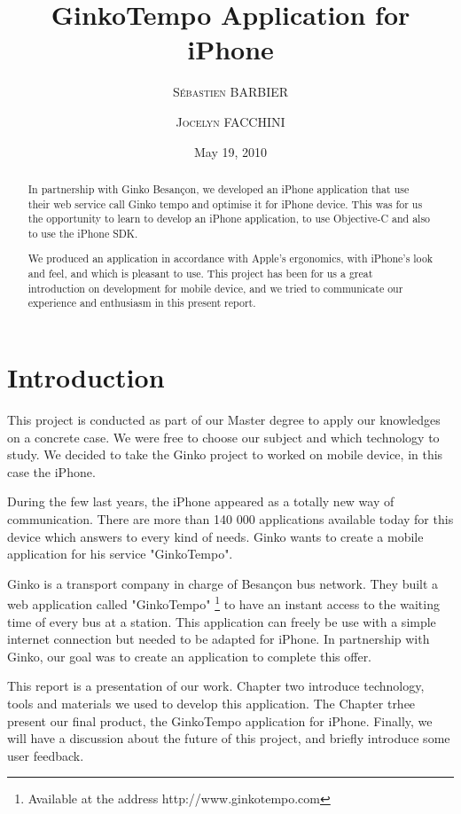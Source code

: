 \documentclass[a4paper, 12pt]{report}
\title{GinkoTempo Application for iPhone}
\date{May 19, 2010}
\author{\textsc{S\'{e}bastien BARBIER} \and \textsc{Jocelyn FACCHINI}}
\begin{document}
	
\maketitle


\begin{abstract} 

In partnership with Ginko Besan\c{c}on, we developed an iPhone application that use their web service call Ginko tempo and optimise it for iPhone device. This was for us the opportunity to learn to develop an iPhone application, to use Objective-C and also to use the iPhone SDK.

We produced an application in accordance with Apple's ergonomics, with iPhone's look and feel, and which is pleasant to use. This project has been for us a great introduction on development for mobile device, and we tried to communicate our experience and enthusiasm in this present report.

\end{abstract}



\tableofcontents


\chapter{Introduction}

This project is conducted as part of our Master degree to apply our knowledges on a concrete case. We were free to choose our subject and which technology to study. We decided to take the Ginko project to worked on mobile device, in this case the iPhone.

During the few last years, the iPhone appeared as a totally new way of communication. There are more than 140 000 applications available today for this device which answers to every kind of needs. Ginko wants to create a mobile application for his service "GinkoTempo".

Ginko is a transport company in charge of Besan\c{c}on bus network. They built a web application called "GinkoTempo" \footnote{Available at the address http://www.ginkotempo.com } to have an instant access to the waiting time of every bus at a station. This application can freely be use with a simple internet connection but needed to be adapted for iPhone. In partnership with Ginko, our goal was to create an application to complete this offer.

This report is a presentation of our work. Chapter two introduce technology, tools and materials we used to develop this application. The Chapter trhee present our final product, the GinkoTempo application for iPhone. Finally, we will have a discussion about the future of this project, and briefly introduce some user feedback.
\end{document}
